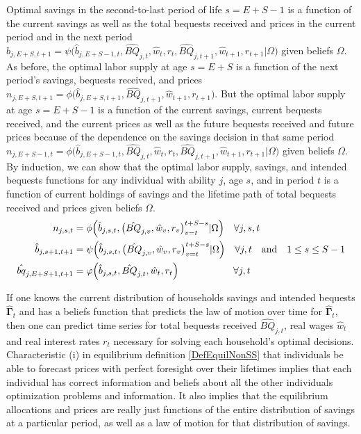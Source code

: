 \documentclass[letterpaper,12pt]{article}
\theoremstyle{definition}
\begin{document}
\begin{spacing}{1.5}
    Optimal savings in the second-to-last period of life $s=E+S-1$ is a function of the current savings as well as the total bequests received and prices in the current period and in the next period $\hat{b}_{j,E+S,t+1} = \psi\bigl(\hat{b}_{j,E+S-1,t},\hat{BQ}_{j,t},\hat{w}_t,r_t,\hat{BQ}_{j,t+1},\hat{w}_{t+1},r_{t+1}|\Omega\bigr)$ given beliefs $\Omega$. As before, the optimal labor supply at age $s=E+S$ is a function of the next period's savings, bequests received, and prices $n_{j,E+S,t+1}=\phi\bigl(\hat{b}_{j,E+S,t+1},\hat{BQ}_{j,t+1},\hat{w}_{t+1},r_{t+1}\bigr)$. But the optimal labor supply at age $s=E+S-1$ is a function of the current savings, current bequests received, and the current prices as well as the future bequests received and future prices because of the dependence on the savings decision in that same period $n_{j,E+S-1,t}=\phi\bigl(\hat{b}_{j,E+S-1,t},\hat{BQ}_{j,t},\hat{w}_t,r_t,\hat{BQ}_{j,t+1},\hat{w}_{t+1},r_{t+1}|\Omega\bigr)$ given beliefs $\Omega$. By induction, we can show that the optimal labor supply, savings, and intended bequests functions for any individual with ability $j$, age $s$, and in period $t$ is a function of current holdings of savings and the lifetime path of total bequests received and prices given beliefs $\Omega$.
    \begin{align}
      n_{j,s,t} &= \phi\Bigl(\hat{b}_{j,s,t},\bigl(\hat{BQ}_{j,v},\hat{w}_v,r_v\bigr)_{v=t}^{t+S-s}|\Omega\Bigr) \quad\forall j,s,t \label{EqLabPolFuncGen} \\
      \hat{b}_{j,s+1,t+1} &= \psi\Bigl(\hat{b}_{j,s,t},\bigl(\hat{BQ}_{j,v},\hat{w}_v,r_v\bigr)_{v=t}^{t+S-s}|\Omega\Bigr) \quad\forall j,t \quad\text{and}\quad 1\leq s\leq S-1 \label{EqSavPolFuncGen} \\
      \hat{bq}_{j,E+S+1,t+1} &= \varphi\Bigl(\hat{b}_{j,s,t},\hat{BQ}_{j,t},\hat{w}_t,r_t\Bigr) \quad\quad\quad\quad\quad\:\:\:\forall j,t \label{EqBeqPolFuncGen}
    \end{align}

    If one knows the current distribution of households savings and intended bequests $\bm{\hat{\Gamma}}_t$ and has a beliefs function that predicts the law of motion over time for $\bm{\hat{\Gamma}}_t$, then one can predict time series for total bequests received $\hat{BQ}_{j,t}$, real wages $\hat{w}_t$ and real interest rates $r_t$ necessary for solving each household's optimal decisions. Characteristic (i) in equilibrium definition \ref{DefEquilNonSS} that individuals be able to forecast prices with perfect foresight over their lifetimes implies that each individual has correct information and beliefs about all the other individuals optimization problems and information. It also implies that the equilibrium allocations and prices are really just functions of the entire distribution of savings at a particular period, as well as a law of motion for that distribution of savings.


\end{spacing}
\end{document}
